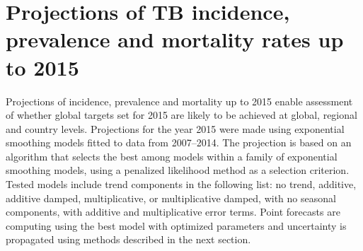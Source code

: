 \section{Projections of TB incidence, prevalence and mortality rates up to 2015} 

Projections of incidence, prevalence and mortality up to 2015 enable assessment of whether global targets set for 2015 are likely to be achieved at global, regional and country levels. Projections for the year 2015 were made using exponential smoothing models fitted to data from 2007–2014. The projection is based on an algorithm that selects the best among models within a family of exponential smoothing models, using a penalized likelihood method as a selection criterion\cite{Hyndman2008-ax}. Tested models include trend components in the following list: no trend, additive, additive damped, multiplicative, or multiplicative damped, with no seasonal components, with additive and multiplicative error terms. Point forecasts are computing using the best model with optimized parameters and uncertainty is propagated using methods described in the next section.

